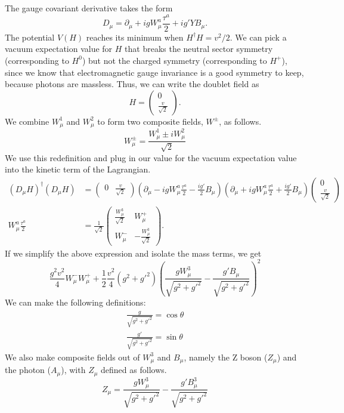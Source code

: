 The gauge covariant derivative takes the form
\[D_\mu = \partial_\mu + igW_\mu^a\frac{\tau^a}{2}+ig'YB_\mu.\]
The potential $V(H)$ reaches its minimum when $H^\dag H = v^2 / 2$. We can pick a vacuum expectation value for $H$ that breaks the neutral sector symmetry (corresponding to $H^0$) but not the charged symmetry (corresponding to $H^{+}$), since we know that electromagnetic gauge invariance is a good symmetry to keep, because photons are massless. Thus, we can write the doublet field as
\[H = \left(\begin{array}{c}0\\\frac{v}{\sqrt{2}}\end{array}\right).\]
We combine $W_\mu^1$ and $W_\mu^2$ to form two composite fields, $W^\pm$, as follows.
\[W_\mu^\pm = \frac{W_\mu^1\pm iW_\mu^2}{\sqrt{2}}\]
We use this redefinition and plug in our value for the vacuum expectation value into the kinetic term of the Lagrangian.
\begin{align*}
  (D_\mu H)^\dag(D_\mu H) &= (\begin{array}{cc} 0 & \frac{v}{\sqrt{2}}\end{array})
  \left(\partial_\mu - igW_\mu^a\frac{\tau^a}{2}
  -\frac{ig'}{2}B_\mu\right)
  \left(\partial_\mu+igW_\mu^a\frac{\tau^a}{2}+\frac{ig'}{2}B_\mu\right)
  \left(\begin{array}{c}0\\\frac{v}{\sqrt{2}}\end{array}\right)\\
  W_\mu^a\frac{\tau^a}{2} &= 
  \frac{1}{\sqrt{2}}
  \left(\begin{array}{cc}
    \frac{W_\mu^3}{\sqrt{2}} & W_\mu^+\\
    W_\mu^- & -\frac{W_\mu^3}{\sqrt{2}}
  \end{array}\right).
\end{align*}
If we simplify the above expression and isolate the mass terms, we get
\[\frac{g^2v^2}{4}W_\mu^-W_\mu^++\frac{1}{2}\frac{v^2}{4}(g^2+g'^2)
\left(\frac{gW_\mu^3}{\sqrt{g^2+g'^2}}-\frac{g'B_\mu}{\sqrt{g^2+g'^2}}\right)^2\]
We can make the following definitions:
\begin{align*}
  \frac{g}{\sqrt{g^2+g'^2}} = \cos\theta\\
  \frac{g'}{\sqrt{g^2+g'^2}} = \sin\theta
\end{align*}
We also make composite fields out of $W_\mu^3$ and $B_\mu$, namely the Z boson ($Z_\mu$) and the photon ($A_\mu$), with $Z_\mu$ defined as follows.
\[Z_\mu = \frac{gW_\mu^3}{\sqrt{g^2+g'^2}}-\frac{g'B_\mu^3}{\sqrt{g^2+g'^2}}\]
